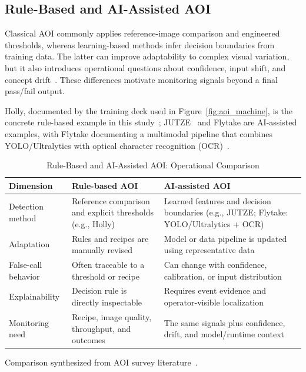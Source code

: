 \documentclass[12pt,a4paper]{article}
\begin{document}
\FloatBarrier

\subsection{Rule-Based and AI-Assisted AOI}

Classical AOI commonly applies reference-image comparison and engineered
thresholds, whereas learning-based methods infer decision boundaries from
training data. The latter can improve adaptability to complex visual variation,
but it also introduces operational questions about confidence, input shift, and
concept drift~\cite{ebayyeh2020aoi,ling2023pcb,gama2014drift}. These differences
motivate monitoring signals beyond a final pass/fail output.

Holly, documented by the training deck used in Figure~\ref{fig:aoi_machine}, is
the concrete rule-based example in this study~\cite{holly}; JUTZE~\cite{jutze}
and Flytake are AI-assisted examples, with Flytake documenting a multimodal
pipeline that combines YOLO/Ultralytics with optical character recognition
(OCR)~\cite{flytake}.

\begin{table}[!ht]
\centering
\small
\caption{Rule-Based and AI-Assisted AOI: Operational Comparison}
\label{tab:rule_vs_ai}
\begin{tabular}{p{} p{} p{}}
\toprule
\textbf{Dimension} & \textbf{Rule-based AOI} & \textbf{AI-assisted AOI} \\
\midrule
Detection method & Reference comparison and explicit thresholds (e.g., Holly) & Learned features and decision boundaries (e.g., JUTZE; Flytake: YOLO/Ultralytics + OCR) \\
Adaptation & Rules and recipes are manually revised & Model or data pipeline is updated using representative data \\
False-call behavior & Often traceable to a threshold or recipe & Can change with confidence, calibration, or input distribution \\
Explainability & Decision rule is directly inspectable & Requires event evidence and operator-visible localization \\
Monitoring need & Recipe, image quality, throughput, and outcomes & The same signals plus confidence, drift, and model/runtime context \\
\bottomrule
\end{tabular}

\vspace{0.3em}
\raggedright\footnotesize Comparison synthesized from AOI survey literature~\cite{ebayyeh2020aoi,ling2023pcb}.
\end{table}
\end{document}
